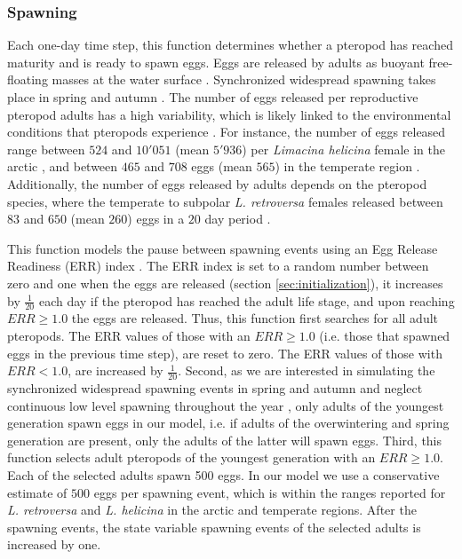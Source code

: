 \subsubsection{Spawning}
Each one-day time step, this function determines whether a pteropod has reached maturity and is ready to spawn eggs. Eggs are released by adults as buoyant free-floating masses at the water surface \citep{Lalli1978Reproduction,Paranjape1968egg,Schalk1990SeasonalSpatial,Gannefors2005Overwintering,Comeau2010Predation,Manno2016EggsAcidification}. Synchronized widespread spawning takes place in spring and autumn \citep{lalli1989pelagic,Thabet2015Lifestages,Wang2017Lifecycle}. The number of eggs released per reproductive pteropod adults has a high variability, which is likely linked to the environmental conditions that pteropods experience \citep{Manno2016EggsAcidification}. For instance, the number of eggs released range between $524$ and $10'051$ (mean $5'936$) per \textit{Limacina helicina} female in the arctic \citep{Lalli1978Reproduction}, and between $465$ and $708$ eggs (mean $565$) in the temperate region \citep{Paranjape1968egg}. Additionally, the number of eggs released by adults depends on the pteropod species, where the temperate to subpolar \textit{L. retroversa} females released  between $83$ and $650$ (mean $260$) eggs in a $20$ day period \citep{Lalli1978Reproduction}.

This function models the pause between spawning events using an Egg Release Readiness (ERR) index \citep[similar to the Clutch Readiness Fraction presented in ][]{Miller1998CalanusIBM}. The ERR index is set to a random number between zero and one when the eggs are released (section \ref{sec:initialization}), it increases by $\frac{1}{20}$ each day if the pteropod has reached the adult life stage, and upon reaching $ERR \geq 1.0$ the eggs are released. Thus, this function first searches for all adult pteropods. The ERR values of those with an $ERR \geq 1.0$ (i.e. those that spawned eggs in the previous time step), are reset to zero. The ERR values of those with $ERR < 1.0$, are increased by $\frac{1}{20}$. Second, as we are interested in simulating the synchronized widespread spawning events in spring and autumn \citep{lalli1989pelagic,Thabet2015Lifestages,Wang2017Lifecycle} and neglect continuous low level spawning throughout the year \citep{Wang2017Lifecycle,Thabet2015Lifestages}, only adults of the youngest generation spawn eggs in our model, i.e. if adults of the overwintering and spring generation are present, only the adults of the latter will spawn eggs. Third, this function selects adult pteropods of the youngest generation with an $ERR \geq 1.0$. Each of the selected adults spawn 500 eggs. In our model we use a conservative estimate of $500$ eggs per spawning event, which is within the ranges reported for \textit{L. retroversa} and \textit{L. helicina} in the arctic and temperate regions. After the spawning events, the state variable spawning events of the selected adults is increased by one.

